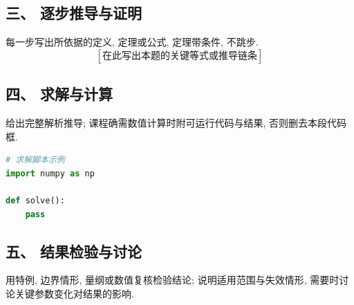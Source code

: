 \documentclass[11pt,a4paper,UTF8]{ctexart}
\begin{document}
\subsection*{三、 逐步推导与证明}
每一步写出所依据的定义, 定理或公式, 定理带条件, 不跳步.
\begin{equation}
    \label{eq:key}
    [\text{在此写出本题的关键等式或推导链条}]
\end{equation}

\subsection*{四、 求解与计算}
给出完整解析推导; 课程确需数值计算时附可运行代码与结果, 否则删去本段代码框.
\begin{lstlisting}[language=Python]
# 求解脚本示例
import numpy as np

def solve():
    pass
\end{lstlisting}

\subsection*{五、 结果检验与讨论}
用特例, 边界情形, 量纲或数值复核检验结论; 说明适用范围与失效情形, 需要时讨论关键参数变化对结果的影响.
\end{document}
